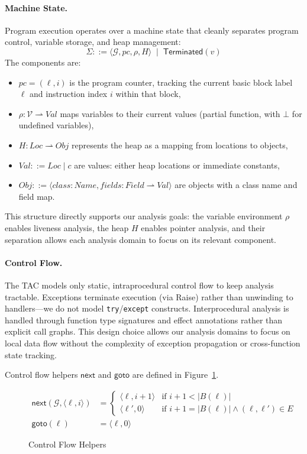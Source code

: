 \paragraph{Machine State.}
Program execution operates over a machine state that cleanly separates program control, variable storage, and heap management:
\[
\Sigma ::= \langle \mathcal{G}, pc, \rho, H \rangle \;\mid\; \mathsf{Terminated}(v)
\]
The components are:
\begin{itemize}
\item $pc = (\ell,i)$ is the program counter, tracking the current basic block label $\ell$ and instruction index $i$ within that block,
\item $\rho : \mathcal{V} \rightharpoonup Val$ maps variables to their current values (partial function, with $\bot$ for undefined variables),
\item $H : Loc \rightharpoonup Obj$ represents the heap as a mapping from locations to objects,
\item $Val ::= Loc \mid c$ are values: either heap locations or immediate constants,
\item $Obj ::= \langle class:Name, fields: Field \rightharpoonup Val \rangle$ are objects with a class name and field map.
\end{itemize}

This structure directly supports our analysis goals: the variable environment $\rho$ enables liveness analysis, the heap $H$ enables pointer analysis, and their separation allows each analysis domain to focus on its relevant component.

\paragraph{Control Flow.}
The TAC models only static, intraprocedural control flow to keep analysis tractable. Exceptions terminate execution (via \textsf{Raise}) rather than unwinding to handlers—we do not model \texttt{try}/\texttt{except} constructs. Interprocedural analysis is handled through function type signatures and effect annotations rather than explicit call graphs. This design choice allows our analysis domains to focus on local data flow without the complexity of exception propagation or cross-function state tracking.

Control flow helpers $\mathsf{next}$ and $\mathsf{goto}$ are defined in Figure~\ref{fig:control-flow-helpers}.

\begin{figure}[ht]
\centering
\[
\begin{aligned}
\mathsf{next}(\mathcal{G}, \langle \ell,i \rangle) &=
\begin{cases}
\langle \ell,i+1 \rangle & \text{if } i+1 < |B(\ell)| \\
\langle \ell',0 \rangle & \text{if } i+1=|B(\ell)| \land (\ell,\ell')\in E
\end{cases} \\
\mathsf{goto}(\ell) &= \langle \ell,0 \rangle
\end{aligned}
\]
\caption{Control Flow Helpers}
\label{fig:control-flow-helpers}
\end{figure}

